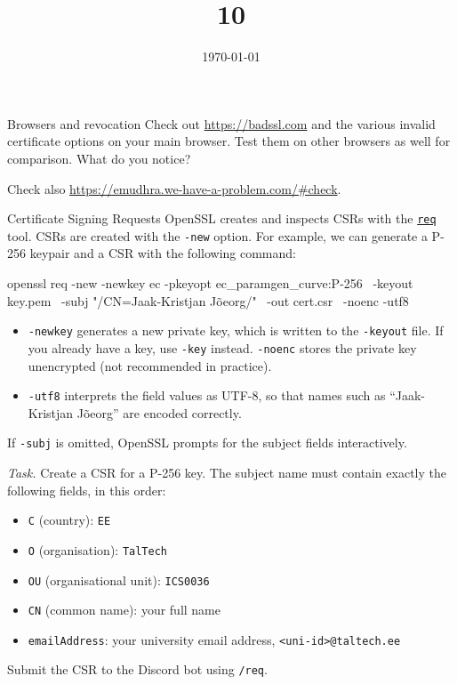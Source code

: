 \documentclass{practice}
\title{10}
\date{\today}
\begin{document}
\maketitle

\begin{task}{Browsers and revocation}
  Check out \url{https://badssl.com} and the various invalid certificate options on your main browser.
  Test them on other browsers as well for comparison.
  What do you notice?

  Check also \url{https://emudhra.we-have-a-problem.com/#check}.
\end{task}

\begin{task}{Certificate Signing Requests}
  OpenSSL creates and inspects CSRs with the \href{https://docs.openssl.org/master/man1/openssl-req/}{\texttt{req}} tool.
  CSRs are created with the \texttt{-new} option.
  For example, we can generate a P-256 keypair and a CSR with the following command:
  \begin{cmdblock}
openssl req -new -newkey ec -pkeyopt ec_paramgen_curve:P-256 \
  -keyout key.pem \
  -subj "/CN=Jaak-Kristjan Jõeorg/" \
  -out cert.csr \
  -noenc -utf8
  \end{cmdblock}
  \begin{itemize}
    \item \texttt{-newkey} generates a new private key, which is written to the \texttt{-keyout} file.
    If you already have a key, use \texttt{-key} instead.
    \texttt{-noenc} stores the private key unencrypted (not recommended in practice).
    \item \texttt{-utf8} interprets the field values as UTF-8, so that names such as \enquote{Jaak-Kristjan Jõeorg} are encoded correctly.
  \end{itemize}

  If \texttt{-subj} is omitted, OpenSSL prompts for the subject fields interactively.

  \textit{Task.}
  Create a CSR for a P-256 key.
  The subject name must contain exactly the following fields, in this order:
  \begin{itemize}
    \item \texttt{C} (country): \texttt{EE}
    \item \texttt{O} (organisation): \texttt{TalTech}
    \item \texttt{OU} (organisational unit): \texttt{ICS0036}
    \item \texttt{CN} (common name): your full name
    \item \texttt{emailAddress}: your university email address, \texttt{<uni-id>@taltech.ee}
  \end{itemize}

  Submit the CSR to the Discord bot using \texttt{/req}.
\end{task}
\end{document}

